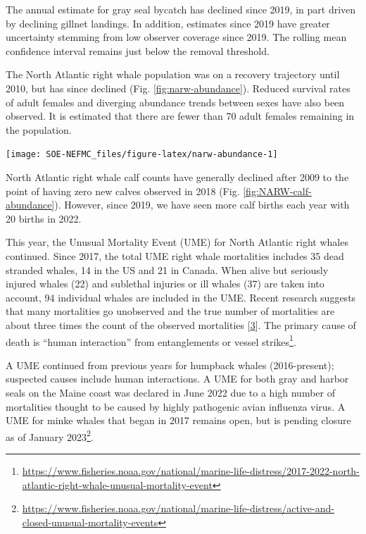 \documentclass[
  10pt,
]{article}
\let\origfigure\figure
\let\endorigfigure\endfigure
\renewenvironment{figure}[1][2] {
    \expandafter\origfigure\expandafter[H]
} {
    \endorigfigure
}
\begin{document}
The annual estimate for gray seal bycatch has declined since 2019, in part driven by declining gillnet landings. In addition, estimates since 2019 have greater uncertainty stemming from low observer coverage since 2019. The rolling mean confidence interval remains just below the removal threshold.

The North Atlantic right whale population was on a recovery trajectory until 2010, but has since declined (Fig. \ref{fig:narw-abundance}). Reduced survival rates of adult females and diverging abundance trends between sexes have also been observed. It is estimated that there are fewer than 70 adult females remaining in the population.

\begin{figure}

{\centering \texttt{[image: SOE-NEFMC\_files/figure-latex/narw-abundance-1]} 

}

\caption{Estimated North Atlanic right whale abundance on the Northeast Shelf.}\label{fig:narw-abundance}
\end{figure}

North Atlantic right whale calf counts have generally declined after 2009 to the point of having zero new calves observed in 2018 (Fig. \ref{fig:NARW-calf-abundance}). However, since 2019, we have seen more calf births each year with 20 births in 2022.

This year, the Unusual Mortality Event (UME) for North Atlantic right whales continued. Since 2017, the total UME right whale mortalities includes 35 dead stranded whales, 14 in the US and 21 in Canada. When alive but seriously injured whales (22) and sublethal injuries or ill whales (37) are taken into account, 94 individual whales are included in the UME. Recent research suggests that many mortalities go unobserved and the true number of mortalities are about three times the count of the observed mortalities {[}\protect\hyperlink{ref-pace_cryptic_2021}{3}{]}. The primary cause of death is ``human interaction'' from entanglements or vessel strikes\footnote{\url{https://www.fisheries.noaa.gov/national/marine-life-distress/2017-2022-north-atlantic-right-whale-unusual-mortality-event}}.

A UME continued from previous years for humpback whales (2016-present); suspected causes include human interactions. A UME for both gray and harbor seals on the Maine coast was declared in June 2022 due to a high number of mortalities thought to be caused by highly pathogenic avian influenza virus. A UME for minke whales that began in 2017 remains open, but is pending closure as of January 2023\footnote{\url{https://www.fisheries.noaa.gov/national/marine-life-distress/active-and-closed-unusual-mortality-events}}.
\end{document}
